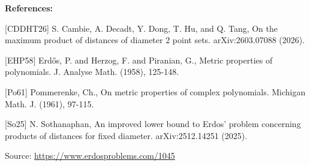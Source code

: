 \documentclass{article}
\begin{document}
\bigskip
\noindent\textbf{References:}

[CDDHT26] S. Cambie, A. Decadt, Y. Dong, T. Hu, and Q. Tang, On the maximum product of distances of diameter 2 point sets. arXiv:2603.07088 (2026).
 
 [EHP58] Erd\H{o}s, P. and Herzog, F. and Piranian, G., Metric properties of polynomials. J. Analyse Math. (1958), 125-148.
 
 [Po61] Pommerenke, Ch., On metric properties of complex polynomials. Michigan Math. J. (1961), 97-115.
 
 [So25] N. Sothanaphan, An improved lower bound to Erdos' problem concerning products of distances for fixed diameter. arXiv:2512.14251 (2025).

\bigskip
\noindent\small{Source: \url{https://www.erdosproblems.com/1045}}
\end{document}
